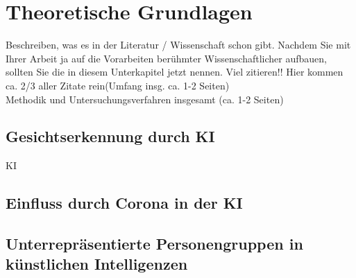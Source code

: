 \newpage
\section{Theoretische Grundlagen} \label{theorie}
Beschreiben, was es in der Literatur / Wissenschaft schon gibt. Nachdem Sie mit Ihrer Arbeit ja auf die Vorarbeiten berühmter Wissenschaftlicher aufbauen, sollten Sie die in diesem Unterkapitel jetzt nennen. Viel zitieren!! Hier kommen ca. 2/3 aller Zitate rein(Umfang insg. ca. 1-2 Seiten)\\
Methodik und Untersuchungsverfahren insgesamt (ca. 1-2 Seiten)

\subsection{Gesichtserkennung durch KI}
\ac{KI}

\subsection{Einfluss durch Corona in der KI}

\subsection{Unterrepräsentierte Personengruppen in künstlichen Intelligenzen}
